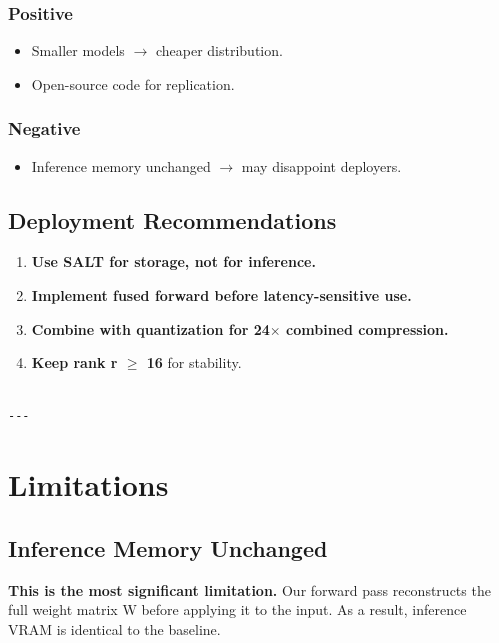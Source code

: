 \subsubsection{Positive}

\begin{itemize}
\item Smaller models $\to$ cheaper distribution.
\item Open-source code for replication.

\end{itemize}
\subsubsection{Negative}

\begin{itemize}
\item Inference memory unchanged $\to$ may disappoint deployers.

\end{itemize}
\subsection{Deployment Recommendations}

\begin{enumerate}
\item \textbf{Use SALT for storage, not for inference.}
\item \textbf{Implement fused forward before latency-sensitive use.}
\item \textbf{Combine with quantization for 24$\times$ combined compression.}
\item \textbf{Keep rank r $\ge$ 16} for stability.
\end{enumerate}
\begin{lstlisting}

---
\end{lstlisting}


\section{Limitations}

\subsection{Inference Memory Unchanged}

\textbf{This is the most significant limitation.} Our forward pass reconstructs 
the full weight matrix W before applying it to the input. As a result, 
inference VRAM is identical to the baseline.

